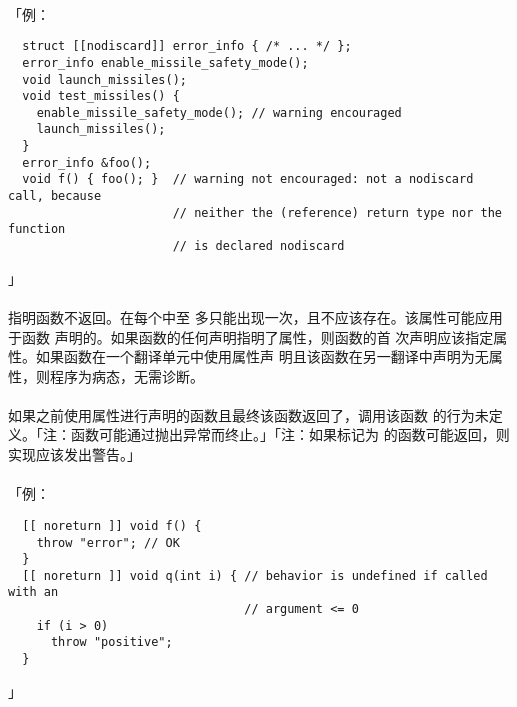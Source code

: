 \paragraph{}
「例：
\begin{lstlisting}
  struct [[nodiscard]] error_info { /* ... */ };
  error_info enable_missile_safety_mode();
  void launch_missiles();
  void test_missiles() {
    enable_missile_safety_mode(); // warning encouraged
    launch_missiles();
  }
  error_info &foo();
  void f() { foo(); }  // warning not encouraged: not a nodiscard call, because
                       // neither the (reference) return type nor the function
                       // is declared nodiscard
\end{lstlisting}」

\paragraph{}
 指明函数不返回。在每个中至
多只能出现一次，且不应该存在。该属性可能应用于函数
声明的。如果函数的任何声明指明了属性，则函数的首
次声明应该指定属性。如果函数在一个翻译单元中使用属性声
明且该函数在另一翻译中声明为无属性，则程序为病态，无需诊断。

\paragraph{}
如果之前使用属性进行声明的函数且最终该函数返回了，调用该函数
的行为未定义。「注：函数可能通过抛出异常而终止。」「注：如果标记为
\tm{[[noreturn]}的函数可能返回，则实现应该发出警告。」

\paragraph{}
「例：
\begin{lstlisting}
  [[ noreturn ]] void f() {
    throw "error"; // OK
  }
  [[ noreturn ]] void q(int i) { // behavior is undefined if called with an
                                 // argument <= 0
    if (i > 0)
      throw "positive";
  }
\end{lstlisting}」
